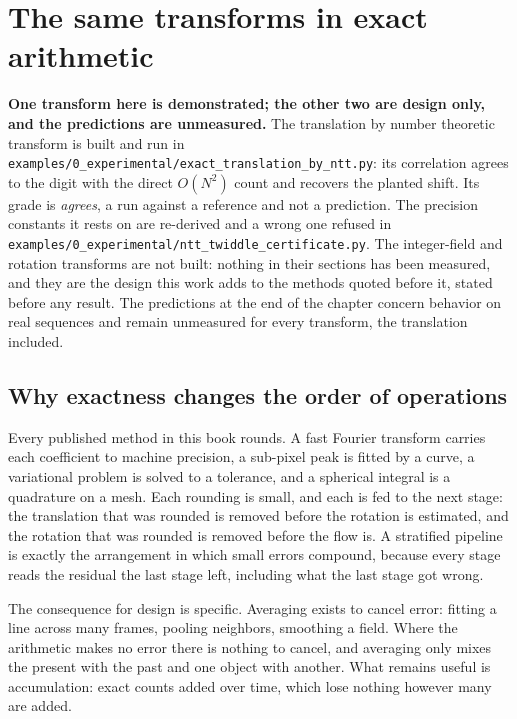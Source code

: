 \chapter{The same transforms in exact arithmetic}

\textbf{One transform here is demonstrated; the other two are design only, and the predictions are
unmeasured.} The translation by number theoretic transform is built and run in
\texttt{examples/\allowbreak{}0\_experimental/\allowbreak{}exact\_translation\_by\_ntt.py}: its
correlation agrees to the digit with the direct \(O(N^2)\) count and recovers the planted shift. Its
grade is \emph{agrees}, a run against a reference and not a prediction. The precision constants it rests
on are re-derived and a wrong one refused in
\texttt{examples/\allowbreak{}0\_experimental/\allowbreak{}ntt\_twiddle\_certificate.py}. The
integer-field and rotation transforms are not built: nothing in their sections has been measured, and
they are the design this work adds to the methods quoted before it, stated before any result. The
predictions at the end of the chapter concern behavior on real sequences and remain unmeasured for
every transform, the translation included.

\section{Why exactness changes the order of operations}

Every published method in this book rounds. A fast Fourier transform carries each coefficient to
machine precision, a sub-pixel peak is fitted by a curve, a variational problem is solved to a
tolerance, and a spherical integral is a quadrature on a mesh. Each rounding is small, and each is
fed to the next stage: the translation that was rounded is removed before the rotation is estimated,
and the rotation that was rounded is removed before the flow is. A stratified pipeline is exactly the
arrangement in which small errors compound, because every stage reads the residual the last stage
left, including what the last stage got wrong.

The consequence for design is specific. Averaging exists to cancel error: fitting a line across many
frames, pooling neighbors, smoothing a field. Where the arithmetic makes no error there is nothing to
cancel, and averaging only mixes the present with the past and one object with another. What remains
useful is accumulation: exact counts added over time, which lose nothing however many are added.

